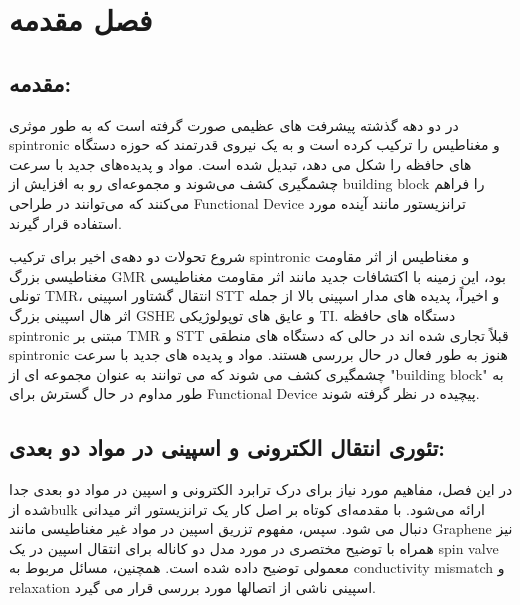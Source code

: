 ﻿\chapter{فصل مقدمه} 
\newpage
\section{مقدمه:}

در دو دهه گذشته پیشرفت های عظیمی صورت گرفته است که به طور موثری \gls{spintronic} و مغناطیس را ترکیب کرده است و به یک نیروی قدرتمند که حوزه دستگاه های حافظه را شکل می دهد، تبدیل شده است. مواد و پدیده‌های جدید با سرعت چشمگیری کشف می‌شوند و مجموعه‌ای رو به افزایش از \gls{building block} را فراهم می‌کنند که می‌توانند در طراحی \gls{Functional Device} ترانزیستور مانند آینده مورد استفاده قرار گیرند.

شروع تحولات دو دهه‌ی اخیر برای ترکیب \gls{spintronic} و مغناطیس از 
اثر مقاومت مغناطیسی بزرگ \gls{GMR} بود، این زمینه با اکتشافات جدید مانند اثر مقاومت مغناطیسی تونلی \gls{TMR}، انتقال گشتاور اسپینی \gls{STT} و اخیراً، پدیده های مدار اسپینی بالا از جمله اثر هال اسپینی بزرگ \gls{GSHE} و عایق های توپولوژیکی \gls{TI}.
دستگاه های حافظه \gls{spintronic} مبتنی بر \gls{TMR} و \gls{STT} قبلاً تجاری شده اند در حالی که دستگاه های منطقی \gls{spintronic} هنوز به طور فعال در حال بررسی هستند. مواد و پدیده های جدید با سرعت چشمگیری کشف می شوند که می توانند به عنوان مجموعه ای از "\gls{building block}" به طور مداوم در حال گسترش برای \gls{Functional Device} پیچیده در نظر گرفته شوند.

\section{تئوری انتقال الکترونی و اسپینی در مواد دو بعدی:}
در این فصل، مفاهیم مورد نیاز برای درک ترابرد الکترونی و اسپین در مواد دو بعدی جدا شده از\gls{bulk} ارائه می‌شود.
با مقدمه‌ای کوتاه بر اصل کار یک ترانزیستور اثر میدانی دنبال می شود. سپس، مفهوم تزریق اسپین در مواد غیر مغناطیسی مانند \gls{Graphene} نیز همراه با توضیح مختصری در مورد مدل دو کاناله برای انتقال اسپین در یک \gls{spin valve} معمولی توضیح داده شده است. همچنین، مسائل مربوط به \gls{conductivity mismatch} و \gls{relaxation} اسپینی ناشی از اتصالها مورد بررسی قرار می گیرد. 

